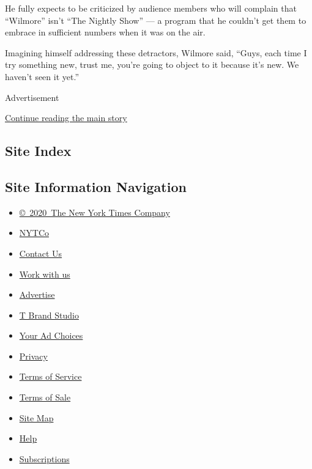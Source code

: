 He fully expects to be criticized by audience members who will complain
that ``Wilmore'' isn't ``The Nightly Show'' --- a program that he
couldn't get them to embrace in sufficient numbers when it was on the
air.

Imagining himself addressing these detractors, Wilmore said, ``Guys,
each time I try something new, trust me, you're going to object to it
because it's new. We haven't seen it yet.''

Advertisement

\protect\hyperlink{after-bottom}{Continue reading the main story}

\hypertarget{site-index}{%
\subsection{Site Index}\label{site-index}}

\hypertarget{site-information-navigation}{%
\subsection{Site Information
Navigation}\label{site-information-navigation}}

\begin{itemize}
\tightlist
\item
  \href{https://help.nytimes3xbfgragh.onion/hc/en-us/articles/115014792127-Copyright-notice}{©~2020~The
  New York Times Company}
\end{itemize}

\begin{itemize}
\tightlist
\item
  \href{https://www.nytco.com/}{NYTCo}
\item
  \href{https://help.nytimes3xbfgragh.onion/hc/en-us/articles/115015385887-Contact-Us}{Contact
  Us}
\item
  \href{https://www.nytco.com/careers/}{Work with us}
\item
  \href{https://nytmediakit.com/}{Advertise}
\item
  \href{http://www.tbrandstudio.com/}{T Brand Studio}
\item
  \href{https://www.nytimes3xbfgragh.onion/privacy/cookie-policy\#how-do-i-manage-trackers}{Your
  Ad Choices}
\item
  \href{https://www.nytimes3xbfgragh.onion/privacy}{Privacy}
\item
  \href{https://help.nytimes3xbfgragh.onion/hc/en-us/articles/115014893428-Terms-of-service}{Terms
  of Service}
\item
  \href{https://help.nytimes3xbfgragh.onion/hc/en-us/articles/115014893968-Terms-of-sale}{Terms
  of Sale}
\item
  \href{https://spiderbites.nytimes3xbfgragh.onion}{Site Map}
\item
  \href{https://help.nytimes3xbfgragh.onion/hc/en-us}{Help}
\item
  \href{https://www.nytimes3xbfgragh.onion/subscription?campaignId=37WXW}{Subscriptions}
\end{itemize}
